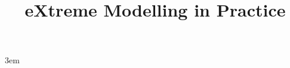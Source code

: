 \documentclass{vldb}
\begin{document}
\emergencystretch 3em


\title{eXtreme Modelling in Practice}



%
%
%
%
\end{document}
